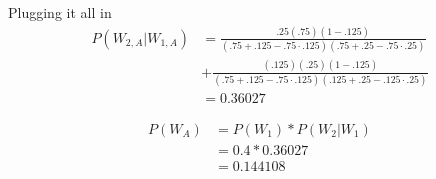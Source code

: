 \documentclass[11pt]{article}
\begin{document}
Plugging it all in
\begin{align*}
    P(W_{2,A} | W_{1,A}) &=\frac{.25\left(.75\right)\left(1-.125\right)}{\left(.75+.125-.75\cdot.125\right)\left(.75+.25-.75\cdot .25\right)}\\
    &+\frac{(.125) (.25)\left(1-.125\right)}{\left(.75+.125-.75\cdot.125\right)\left(.125+.25-.125\cdot .25\right)}\\
    &= 0.36027
\end{align*}

\begin{align*}
    P(W_A) &= P(W_1) * P(W_2 | W_1)\\
    &= 0.4 * 0.36027\\
    &= 0.144108
\end{align*}
\end{document}
